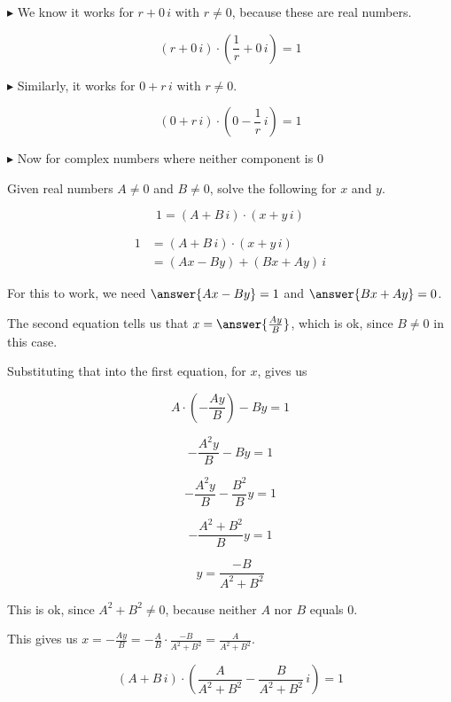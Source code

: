 \documentclass{ximera}
\begin{document}
$\blacktriangleright$  We know it works for $r + 0 \, i$ with $r \ne 0$, because these are real numbers.


\[   (r + 0 \, i) \cdot \left(\frac{1}{r} + 0 \, i \right) = 1        \]







$\blacktriangleright$  Similarly, it works for $0 + r \, i$ with $r \ne 0$.


\[   (0 + r \, i) \cdot \left(0 - \frac{1}{r} \, i \right) = 1        \]





$\blacktriangleright$ Now for complex numbers where neither component is $0$


\begin{explanation}


Given real numbers $A \ne 0$ and $B \ne 0$, solve the following for $x$ and $y$.


\[       1 = (A + B \, i) \cdot (x + y \, i)            \]



\begin{align*}
1          & = (A + B \, i) \cdot (x + y \, i)      \\
           & = (Ax-By) + (Bx+Ay) \, i
\end{align*}


For this to work, we need $\answer{A x - B y} = 1$ and $\answer{B x + A y} = 0$.



The second equation tells us that $x = \answer{\frac{A y}{B}}$, which is ok, since $B \ne 0$ in this case.

Substituting that into the first equation, for $x$, gives us


\[   A \cdot \left(-\frac{A y}{B}\right) - B y = 1     \]


\[   -\frac{A^2 y}{B} - B y = 1     \]

\[   -\frac{A^2 y}{B} - \frac{B^2}{B} y = 1     \]


\[   -\frac{A^2 + B^2}{B} y = 1     \]


\[  y = \frac{-B}{A^2 + B^2}     \]

This is ok, since $A^2 + B^2 \ne 0$, because neither $A$ nor $B$ equals $0$.



This gives us $x = -\frac{A y}{B} = -\frac{A}{B} \cdot \frac{-B}{A^2 + B^2} = \frac{A}{A^2 + B^2} $.







\[       (A + B \, i) \cdot \left( \frac{A}{A^2 + B^2} - \frac{B}{A^2 + B^2} \, i \right) = 1            \]



\end{explanation}
\end{document}
